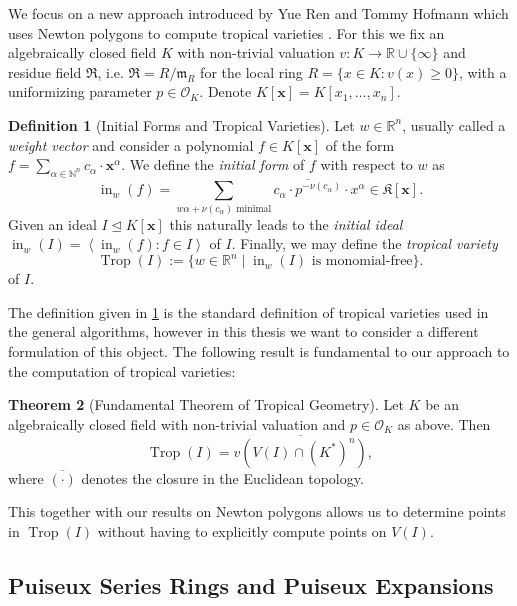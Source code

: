 \documentclass[
  paper=a4,
  DIV=14,
  fontsize=12pt,
  titlepage,
  bibliography=totoc,
  listof=totoc,
  pagesize=pdftex
]{scrartcl}
\numberwithin{figure}{section}
\numberwithin{equation}{section}
\numberwithin{table}{section}
\newcommand*\setR{\mathds{R}}
\newcommand*\setN{\mathds{N}}
\newcommand*\ideal[1]{\left\langle #1 \right\rangle}
\let\vec\mathbf
\let\idealof\trianglelefteq
\DeclareMathOperator{\Trop}{Trop}
\DeclareMathOperator{\initial}{in}
\theoremstyle{definition}
\newtheorem{definition}{Definition}
\newtheorem{theorem}[definition]{Theorem}
\numberwithin{definition}{section}
\begin{document}
We focus on a new approach introduced by Yue Ren and Tommy Hofmann which uses Newton
polygons to compute tropical varieties \cite{tropPointsLinks}. For this we fix an
algebraically closed field $K$ with non-trivial valuation $v:K\to\setR \cup \{\infty\}$
and residue field $\mathfrak R$, i.e. $\mathfrak R = R/\mathfrak m_R$ for the local ring
$R = \{ x \in K : v(x) \geq 0 \}$, with a uniformizing parameter $p\in \mathcal O_K$.
Denote $K[\vec x] = K[x_1, \ldots, x_n]$.


\begin{definition}[Initial Forms and Tropical Varieties]
  Let $w \in \setR^n$, usually called a \emph{weight vector} and consider a polynomial $f
  \in K[\vec x]$ of the form $f = \sum_{\alpha \in \setN^n} c_\alpha \cdot \vec x^\alpha$.
  We define the \emph{initial form} of $f$ with respect to $w$ as
  \[
    \initial_w(f) = \sum_{w\alpha + \nu(c_\alpha) \text{ minimal}}
    \overline{c_\alpha \cdot p^{-\nu(c_\alpha)}} \cdot x^\alpha
    \in \mathfrak K[\vec x].
  \]
  Given an ideal $I \idealof K[\vec x]$ this naturally leads to the \emph{initial ideal}
  $\initial_w(I) = \ideal{\initial_w(f) : f\in I}$ of $I$. Finally, we may define the
  \emph{tropical variety}
  \[
    \Trop(I) := \{ w \in \setR^n \mid \initial_w(I) \text{ is monomial-free} \}.
  \]
  of $I$.
  \label{def:tropicalVarietyVal}
\end{definition}

The definition given in \ref{def:tropicalVarietyVal} is the standard definition of
tropical varieties used in the general algorithms, however in this thesis we want to
consider a different formulation of this object. The following result is fundamental to
our approach to the computation of tropical varieties:

\begin{theorem}[Fundamental Theorem of Tropical Geometry]
  Let $K$ be an algebraically closed field with non-trivial valuation and $p\in \mathcal
  O_K$ as above. Then
  \[
    \Trop(I) = \overline{v(V(I) \cap (K^\ast)^n)},
  \]
  where $\overline{(\cdot)}$ denotes the closure in the Euclidean topology.
  \label{thm:fundamentalThmTropicalGeometry}
\end{theorem}

This together with our results on Newton polygons allows us to determine points in
$\Trop(I)$ without having to explicitly compute points on $V(I)$.

\subsection{Puiseux Series Rings and Puiseux Expansions}
\end{document}
